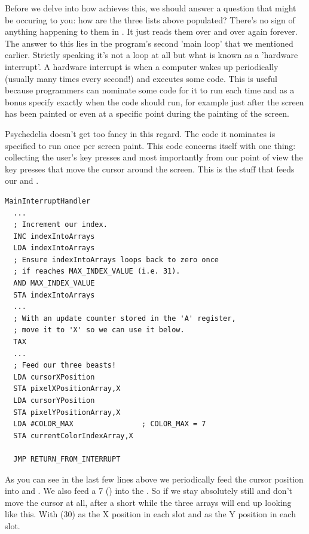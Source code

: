 Before we delve into how  achieves this, we should answer a question that might be occuring to you: how
are the three lists above populated? There's no sign of anything happening to them in . It just reads them over and
over again forever. The answer to this lies in the program's second 'main loop' that we mentioned earlier. 
Strictly speaking it's not a loop at all but what is known
as a 'hardware interrupt'. A hardware interrupt is when a computer wakes up periodically (usually many times every second!) and executes
some code. This is useful because programmers can nominate some code for it to run each time and as a bonus specify exactly when the code
should run, for example just after the screen has been painted or even at a specific point during the painting of the screen.  

Psychedelia doesn't get too fancy in this regard. The code it nominates is specified to run once per screen paint. This code concerns itself
with one thing: collecting the user's key presses and most importantly from our point of view the key presses that move the cursor around
the screen. This is the stuff that feeds our  and .

\begin{lstlisting}
MainInterruptHandler   
  ...
  ; Increment our index.
  INC indexIntoArrays
  LDA indexIntoArrays
  ; Ensure indexIntoArrays loops back to zero once
  ; if reaches MAX_INDEX_VALUE (i.e. 31).
  AND MAX_INDEX_VALUE
  STA indexIntoArrays
  ...
  ; With an update counter stored in the 'A' register,
  ; move it to 'X' so we can use it below.
  TAX
  ...
  ; Feed our three beasts!
  LDA cursorXPosition
  STA pixelXPositionArray,X
  LDA cursorYPosition
  STA pixelYPositionArray,X
  LDA #COLOR_MAX                ; COLOR_MAX = 7
  STA currentColorIndexArray,X

  JMP RETURN_FROM_INTERRUPT
\end{lstlisting}

As you can see in the last few lines above we periodically feed the cursor position into  and .
We also feed a 7 () into the . So if we stay absolutely still and don't move the cursor at all, after
a short while the three arrays will end up looking like this. With (30) as the X position in each slot and  as the Y
position in each slot.

